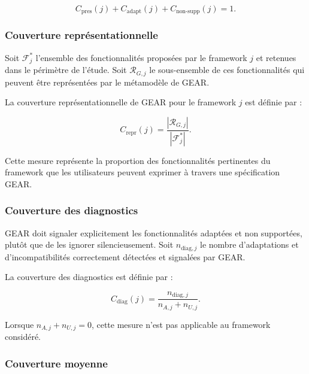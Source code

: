 \begin{equation}
C_{\mathrm{pres}}(j)
+
C_{\mathrm{adapt}}(j)
+
C_{\mathrm{non\text{-}supp}}(j)
= 1.
\label{eq:somme-couverture}
\end{equation}


\subsubsection{Couverture représentationnelle}

Soit $\mathcal{F}^{*}_{j}$ l'ensemble des fonctionnalités proposées
par le framework $j$ et retenues dans le périmètre de l'étude. Soit
$\mathcal{R}_{G,j}$ le sous-ensemble de ces fonctionnalités qui peuvent
être représentées par le métamodèle de GEAR.

La couverture représentationnelle de GEAR pour le framework $j$ est
définie par :

\begin{equation}
C_{\mathrm{repr}}(j)
=
\frac{
    \left|\mathcal{R}_{G,j}\right|
}{
    \left|\mathcal{F}^{*}_{j}\right|
}.
\label{eq:couverture-representationnelle}
\end{equation}

Cette mesure représente la proportion des fonctionnalités pertinentes
du framework que les utilisateurs peuvent exprimer à travers une
spécification GEAR.


\subsubsection{Couverture des diagnostics}

GEAR doit signaler explicitement les fonctionnalités adaptées et non
supportées, plutôt que de les ignorer silencieusement. Soit
$n_{\mathrm{diag},j}$ le nombre d'adaptations et d'incompatibilités
correctement détectées et signalées par GEAR.

La couverture des diagnostics est définie par :

\begin{equation}
C_{\mathrm{diag}}(j)
=
\frac{
    n_{\mathrm{diag},j}
}{
    n_{A,j}+n_{U,j}
}.
\label{eq:couverture-diagnostics}
\end{equation}

Lorsque $n_{A,j}+n_{U,j}=0$, cette mesure n'est pas applicable au
framework considéré.


\subsubsection{Couverture moyenne}

